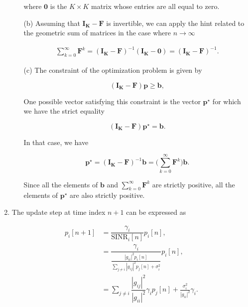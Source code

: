 \documentclass [a4paper, 11pt] {article}
\begin{document}
\begin{solution}
\begin{enumerate}
\begin{itemize}
        where $\mathbf{0}$ is the $K \times K$ matrix whose entries are all equal to zero.

        \item[(b)] Assuming that $\mathbf{I_K - F}$ is invertible, we can apply the hint related to the geometric sum of matrices in the case where $n \rightarrow \infty$

        \begin{align}
            \sum_{k=0}^{\infty} \mathbf{F}^k = (\mathbf{I_K} - \mathbf{F})^{-1}(\mathbf{I_K} - \mathbf{0}) = (\mathbf{I_K} - \mathbf{F})^{-1}.
        \end{align}

        \item[(c)] The constraint of the optimization problem is given by

        \begin{equation}
        (\mathbf{I_K} - \mathbf{F})\mathbf{p} \geq \mathbf{b},
        \end{equation}

        One possible vector satisfying this constraint is the vector $\mathbf{p}^\star$ for which we have the strict equality

        \begin{equation}
        (\mathbf{I_K} - \mathbf{F})\mathbf{p}^\star = \mathbf{b}.
        \end{equation}

        In that case, we have

        \begin{equation}
        \mathbf{p}^\star = (\mathbf{I_K} - \mathbf{F})^{-1}\mathbf{b} = \Bigg(\sum_{k=0}^{\infty} \mathbf{F}^k \Bigg) \mathbf{b}.
        \end{equation}

        Since all the elements of $\mathbf{b}$ and $\sum_{k=0}^{\infty} \mathbf{F}^k$ are strictly positive, all the elements of $\mathbf{p}^\star$ are also strictly positive.
    \end{itemize}

    \item The update step at time index $n+1$ can be expressed as

    \begin{align}
        p_i[n+1] &= \dfrac{\gamma_i}{\text{SINR}_i[n]}p_i[n],\\
        &= \dfrac{\gamma_i}{\frac{|g_{ii}|^2p_i[n]}{ \sum_{j\neq i} |g_{ij}|^2p_j[n] + \sigma_i^2}}p_i[n],\\
        &= \sum_{j\neq i} \dfrac{|g_{ij}|^2}{|g_{ii}|^2}\gamma_i p_j[n] + \frac{\sigma_i^2}{|g_{ii}|^2} \gamma_i.
    \end{align}


\end{enumerate}
\end{solution}
\end{document}
